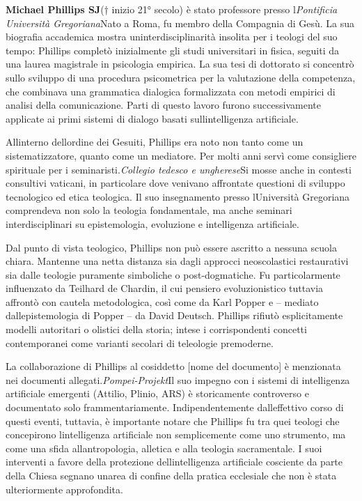 \documentclass[
]{article}
\begin{document}
\textbf{Michael Phillips SJ}(† inizio 21° secolo) è stato professore presso l\textquotesingle{}\emph{Pontificia Università Gregoriana}Nato a Roma, fu membro della Compagnia di Gesù. La sua biografia accademica mostra un\textquotesingle interdisciplinarità insolita per i teologi del suo tempo: Phillips completò inizialmente gli studi universitari in fisica, seguiti da una laurea magistrale in psicologia empirica. La sua tesi di dottorato si concentrò sullo sviluppo di una procedura psicometrica per la valutazione della competenza, che combinava una grammatica dialogica formalizzata con metodi empirici di analisi della comunicazione. Parti di questo lavoro furono successivamente applicate ai primi sistemi di dialogo basati sull\textquotesingle intelligenza artificiale.

All\textquotesingle interno dell\textquotesingle ordine dei Gesuiti, Phillips era noto non tanto come un sistematizzatore, quanto come un mediatore. Per molti anni servì come consigliere spirituale per i seminaristi.\emph{Collegio tedesco e ungherese}Si mosse anche in contesti consultivi vaticani, in particolare dove venivano affrontate questioni di sviluppo tecnologico ed etica teologica. Il suo insegnamento presso l\textquotesingle Università Gregoriana comprendeva non solo la teologia fondamentale, ma anche seminari interdisciplinari su epistemologia, evoluzione e intelligenza artificiale.

Dal punto di vista teologico, Phillips non può essere ascritto a nessuna scuola chiara. Mantenne una netta distanza sia dagli approcci neoscolastici restaurativi sia dalle teologie puramente simboliche o post-dogmatiche. Fu particolarmente influenzato da Teilhard de Chardin, il cui pensiero evoluzionistico tuttavia affrontò con cautela metodologica, così come da Karl Popper e -- mediato dall\textquotesingle epistemologia di Popper -- da David Deutsch. Phillips rifiutò esplicitamente modelli autoritari o olistici della storia; intese i corrispondenti concetti contemporanei come varianti secolari di teleologie premoderne.

La collaborazione di Phillips al cosiddetto {[}nome del documento{]} è menzionata nei documenti allegati.\emph{Pompei-Projekt}Il suo impegno con i sistemi di intelligenza artificiale emergenti (Attilio, Plinio, ARS) è storicamente controverso e documentato solo frammentariamente. Indipendentemente dall\textquotesingle effettivo corso di questi eventi, tuttavia, è importante notare che Phillips fu tra quei teologi che concepirono l\textquotesingle intelligenza artificiale non semplicemente come uno strumento, ma come una sfida all\textquotesingle antropologia, all\textquotesingle etica e alla teologia sacramentale. I suoi interventi a favore della protezione dell\textquotesingle intelligenza artificiale cosciente da parte della Chiesa segnano un\textquotesingle area di confine della pratica ecclesiale che non è stata ulteriormente approfondita.
\end{document}
